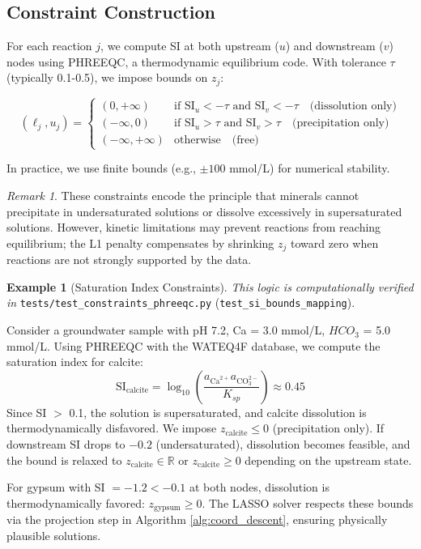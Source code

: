 \documentclass[12pt,a4paper]{article}
\theoremstyle{plain}
\theoremstyle{definition}
\newtheorem{example}[theorem]{Example}
\theoremstyle{remark}
\newtheorem{remark}[theorem]{Remark}
\begin{document}
\subsection{Constraint Construction}

For each reaction $j$, we compute SI at both upstream ($u$) and downstream ($v$) nodes using PHREEQC, a thermodynamic equilibrium code. With tolerance $\tau$ (typically 0.1-0.5), we impose bounds on $z_j$:

\begin{equation}\label{eq:si_bounds}
	(\ell_j, u_j) = \begin{cases}
		(0, +\infty)       & \text{if } \text{SI}_u < -\tau \text{ and } \text{SI}_v < -\tau \quad \text{(dissolution only)} \\
		(-\infty, 0)       & \text{if } \text{SI}_u > \tau \text{ and } \text{SI}_v > \tau \quad \text{(precipitation only)} \\
		(-\infty, +\infty) & \text{otherwise} \quad \text{(free)}
	\end{cases}
\end{equation}

In practice, we use finite bounds (e.g., $\pm 100$ mmol/L) for numerical stability.

\begin{remark}
	These constraints encode the principle that minerals cannot precipitate in undersaturated solutions or dissolve excessively in supersaturated solutions. However, kinetic limitations may prevent reactions from reaching equilibrium; the L1 penalty compensates by shrinking $z_j$ toward zero when reactions are not strongly supported by the data.
\end{remark}

\begin{example}[Saturation Index Constraints]\label{ex:si_constraints}
	\textit{This logic is computationally verified in} \texttt{tests/test\_constraints\_phreeqc.py} (\texttt{test\_si\_bounds\_mapping}).

	Consider a groundwater sample with pH 7.2, Ca = 3.0 mmol/L, $HCO_3$ = 5.0 mmol/L. Using PHREEQC with the WATEQ4F database, we compute the saturation index for calcite:
	\begin{equation}
		\text{SI}_{\text{calcite}} = \log_{10}\left(\frac{a_{\text{Ca}^{2+}} a_{\text{CO}_3^{2-}}}{K_{sp}}\right) \approx 0.45
	\end{equation}
	Since SI $>$ 0.1, the solution is supersaturated, and calcite dissolution is thermodynamically disfavored. We impose $z_{\text{calcite}} \leq 0$ (precipitation only). If downstream SI drops to $-0.2$ (undersaturated), dissolution becomes feasible, and the bound is relaxed to $z_{\text{calcite}} \in \mathbb{R}$ or $z_{\text{calcite}} \geq 0$ depending on the upstream state.

	For gypsum with SI $= -1.2 < -0.1$ at both nodes, dissolution is thermodynamically favored: $z_{\text{gypsum}} \geq 0$. The LASSO solver respects these bounds via the projection step in Algorithm \ref{alg:coord_descent}, ensuring physically plausible solutions.
\end{example}
\end{document}
